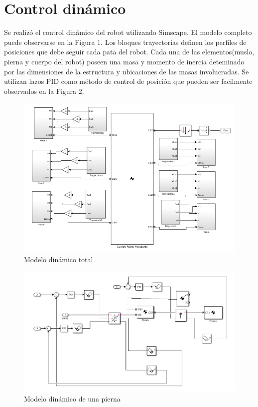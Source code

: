 \documentclass{article}
\begin{document}
\setcounter{secnumdepth}{0}
\section{Control dinámico}

Se realizó el control dinámico del robot utilizando Simscape. El modelo completo puede observarse en la Figura 1. Los bloques trayectorias definen los perfiles de posiciones que debe seguir cada pata del robot. Cada una de las elementos(muslo, pierna y cuerpo del robot) poseen una masa y momento de inercia deteminado por las dimensiones de la estructura y ubicaciones de las masas involucradas. Se utilizan lazos PID como método de control de posición que pueden ser facilmente observados en la Figura 2. 

\begin{figure}[!h]
  \centering
  \includegraphics[width=1\linewidth]{hex.png}
  \caption{Modelo dinámico total}
\end{figure}

\begin{figure}[!h]
  \centering
  \includegraphics[width=1\linewidth]{leg.png}
  \caption{Modelo dinámico de una pierna}
\end{figure}
\end{document}
